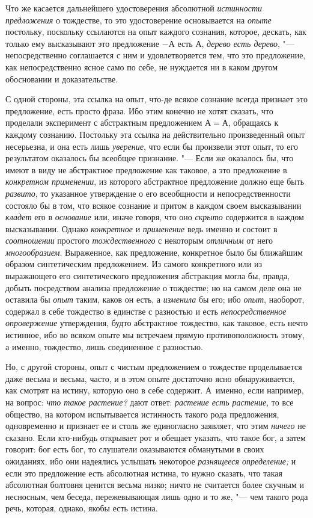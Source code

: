 Что же касается дальнейшего удостоверения абсолютной
{\em истинности предложения} о тождестве, то это
удостоверение основывается на {\em опыте} постольку,
поскольку ссылаются на опыт каждого сознания, которое, дескать, как только
ему высказывают это предложение $-А$ есть $А$,
{\em дерево есть дерево}, "--- непосредственно соглашается
с ним и удовлетворяется тем, что это предложение, как непосредственно ясное
само по себе, не нуждается ни в каком другом обосновании и доказательстве.

С одной стороны, эта ссылка на опыт, что-де всякое сознание всегда признает
это предложение, есть просто фраза. Ибо этим конечно не хотят сказать, что
проделали эксперимент с абстрактным предложением $А=А$,
обращаясь к каждому сознанию. Постольку эта ссылка на действительно
произведенный опыт несерьезна, и она есть лишь
{\em уверение}, что если бы произвели этот опыт, то его
результатом оказалось бы всеобщее признание. "--- Если же оказалось бы, что
имеют в виду не абстрактное предложение как таковое, а это предложение в
{\em конкретном применении}, из которого абстрактное
предложение должно еще быть {\em развито}, то указанное
утверждение о его всеобщности и непосредственности состояло бы в том, что
всякое сознание и притом в каждом своем высказывании
{\em кладет} его в {\em основание}
или, иначе говоря, что оно {\em скрыто} содержится в
каждом высказывании. Однако {\em конкретное} и
{\em применение} ведь именно и состоит в
{\em соотношении} простого
{\em тождественного} с некоторым
{\em отличным} от него
{\em многообразием}. Выраженное, как предложение,
конкретное было бы ближайшим образом синтетическим предложением. Из самого
конкретного или из выражающего его синтетического предложения абстракция
могла бы, правда, добыть посредством анализа предложение о тождестве; но на
самом деле она не оставила бы {\em опыт} таким, каков
он есть, а {\em изменила} бы его; ибо
{\em опыт}, наоборот, содержал в себе тождество в
единстве с разностью и есть {\em непосредственное
опровержение} утверждения, будто абстрактное тождество, как таковое, есть
нечто истинное, ибо во всяком опыте мы встречаем прямую противоположность
этому, а именно, тождество, лишь соединенное с разностью.

Но, с другой стороны, опыт с чистым предложением о тождестве проделывается
даже весьма и весьма, часто, и в этом опыте достаточно ясно обнаруживается,
как смотрят на истину, которую оно в себе содержит. А~именно, если
например, на вопрос: {\em что такое растение?} дают
ответ: {\em растение есть растение}, то все общество,
на котором испытывается истинность такого рода предложения, одновременно и
признает ее и столь же единогласно заявляет, что этим
{\em ничего} не сказано. Если кто-нибудь открывает рот
и обещает указать, что такое бог, а затем говорит: бог есть бог, то
слушатели оказываются обманутыми в своих ожиданиях, ибо они надеялись
услышать некоторое {\em разнящееся определение;} и если
это предложение есть абсолютная истина, то нужно сказать, что такая
абсолютная болтовня ценится весьма низко; ничто не считается более скучным
и несносным, чем беседа, пережевывающая лишь одно и то же, "--- чем такого
рода речь, которая, однако, якобы есть истина.


